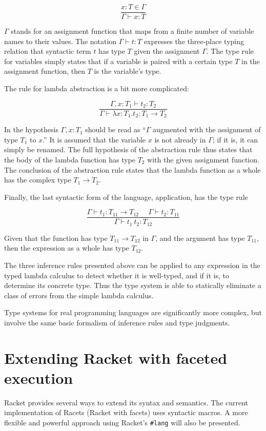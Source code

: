 \documentclass{article}
\begin{document}
\[
\frac{x : T \in \Gamma}
{\Gamma \vdash x : T}
\]

$\Gamma$ stands for an assignment function that maps from a finite number of variable names to their values. The notation $\Gamma \vdash t : T$ expresses the three-place typing relation that syntactic term $t$ has type $T$ given the assignment $\Gamma$. The type rule for variables simply states that if a variable is paired with a certain type $T$ in the assignment function, then $T$ is the variable's type.

The rule for lambda abstraction is a bit more complicated:

\[
\frac{\Gamma, x : T_1 \vdash t_2 : T_2}
{\Gamma \vdash \lambda x : T_1 . t_2 : T_1 \to T_2}
\]

In the hypothesis $\Gamma, x : T_1$ should be read as ``$\Gamma$ augmented with the assignment of type $T_1$ to $x$.'' It is assumed that the variable $x$ is not already in $\Gamma$; if it is, it can simply be renamed. The full hypothesis of the abstraction rule thus states that the body of the lambda function has type $T_2$ with the given assignment function. The conclusion of the abstraction rule states that the lambda function as a whole has the complex type $T_1 \to T_2$.

Finally, the last syntactic form of the language, application, has the type rule

\[
\frac{\Gamma \vdash t_1 : T_{11} \to T_{12}\ \ \ \ \ \ \Gamma \vdash t_2 : T_{11}}
{\Gamma \vdash t_1\ t_2 : T_{12}}
\]

Given that the function has type $T_{11} \to T_{12}$ in $\Gamma$, and the argument has type $T_{11}$, then the expression as a whole has type $T_{12}$.

The three inference rules presented above can be applied to any expression in the typed lambda calculus to detect whether it is well-typed, and if it is, to determine its concrete type. Thus the type system is able to statically eliminate a class of errors from the simple lambda calculus.

Type systems for real programming languages are significantly more complex, but involve the same basic formalism of inference rules and type judgments.

\section{Extending Racket with faceted execution}
Racket provides several ways to extend its syntax and semantics. The current implementation of Racets (Racket with facets) uses syntactic macros. A more flexible and powerful approach using Racket's \texttt{\#lang} will also be presented.
\end{document}
